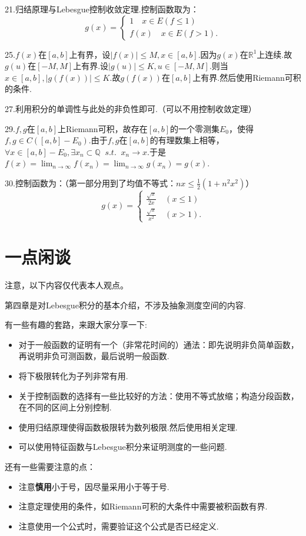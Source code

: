 \documentclass[bwprint, withoutpreface]{cumcmthesis}
\begin{document}
21.归结原理与Lebesgue控制收敛定理.控制函数取为：
\begin{equation*}
	g(x) = 
	\begin{cases}
		1 \quad x \in E(f \leqslant 1) \\
		f(x) \quad x \in E(f > 1).
	\end{cases}
\end{equation*}

25.$f(x)$在$[a, b]$上有界，设$|f(x)| \leqslant M, x \in [a, b]$.因为$g(x)$在$\mathbb{R}^1$上连续.故$g(u)$在$[-M, M]$上有界.设$|g(u)| \leqslant K, u \in [-M, M]$.则当$x \in [a, b], |g(f(x))| \leqslant K$.故$g(f(x))$在$[a, b]$上有界.然后使用Riemann可积的条件.

27.利用积分的单调性与此处的非负性即可.（可以不用控制收敛定理）

29.$f, g$在$[a, b]$上Riemann可积，故存在$[a, b]$的一个零测集$E_0$，使得$f, g \in C([a, b] - E_0)$.由于$f, g$在$[a, b]$的有理数集上相等，$\forall x \in [a, b] - E_0, \exists {x_n} \subset \mathbb{Q} \mathop{} \! s.t. \! \mathop{} x_n \to x$.于是$f(x) = \lim_{n \to \infty}{f(x_n)} = \lim_{n \to \infty}{g(x_n)} = g(x)$.

30.控制函数为：（第一部分用到了均值不等式：$nx \leqslant \frac{1}{2}(1 + n^2 x^2)$）
\begin{equation*}
	g(x) = 
	\begin{cases}
		\frac{\sqrt{x}}{2x} \quad (x \leqslant 1) \\
		\frac{\sqrt{x}}{x^2} \quad (x > 1).
	\end{cases}
\end{equation*}

\section{一点闲谈}
\indent 注意，以下内容仅代表本人观点。

第四章是对Lebesgue积分的基本介绍，不涉及抽象测度空间的内容.

有一些有趣的套路，来跟大家分享一下:
\begin{itemize}[itemindent=2em]
	\item 对于一般函数的证明有一个（非常花时间的）通法：即先说明非负简单函数，再说明非负可测函数，最后说明一般函数.
	\item 将下极限转化为子列非常有用.
	\item 关于控制函数的选择有一些比较好的方法：使用不等式放缩；构造分段函数，在不同的区间上分别控制.
	\item 使用归结原理使得函数极限转为数列极限.然后使用相关定理.
	\item 可以使用特征函数与Lebesgue积分来证明测度的一些问题.
\end{itemize}

还有一些需要注意的点：
\begin{itemize}[itemindent=2em]
	\item 注意\textbf{慎用}小于号，因尽量采用小于等于号.
	\item 注意定理使用的条件，如Riemann可积的大条件中需要被积函数有界.
	\item 注意使用一个公式时，需要验证这个公式是否已经定义.
\end{itemize}
\end{document}
